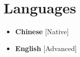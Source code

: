 \documentclass[11pt,a4paper,sans]{moderncv}
\begin{document}
\section{Languages}

\begin{multicols}{2}
  \begin{itemize}[label=\textbullet]
    \item \textbf{Chinese} [Native]
    \item \textbf{English} [Advanced]
  \end{itemize}
\end{multicols}
\end{document}
